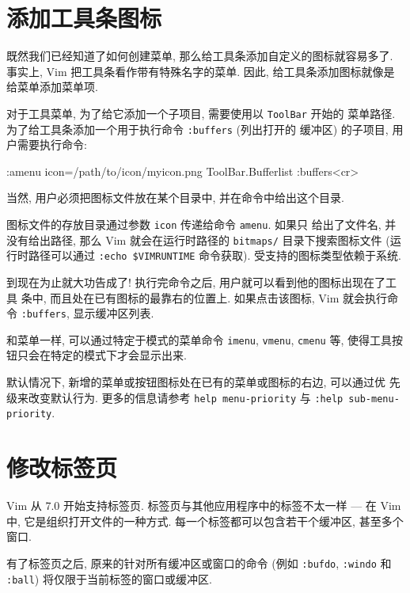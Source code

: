 \begin{warning}
\section{添加工具条图标}
\label{sec:adding_toolbar_icons}

既然我们已经知道了如何创建菜单, 那么给工具条添加自定义的图标就容易多了.
事实上, Vim 把工具条看作带有特殊名字的菜单. 因此, 给工具条添加图标就像是
给菜单添加菜单项.

对于工具菜单, 为了给它添加一个子项目, 需要使用以 \texttt{ToolBar} 开始的
菜单路径. 为了给工具条添加一个用于执行命令 \texttt{:buffers} (列出打开的
缓冲区) 的子项目, 用户需要执行命令:
\begin{vimcmd}
:amenu icon=/path/to/icon/myicon.png ToolBar.Bufferlist :buffers<cr>
\end{vimcmd}
当然, 用户必须把图标文件放在某个目录中, 并在命令中给出这个目录.

图标文件的存放目录通过参数 \texttt{icon} 传递给命令 \texttt{amenu}. 如果只
给出了文件名, 并没有给出路径, 那么 Vim 就会在运行时路径的 \texttt{bitmaps/}
目录下搜索图标文件 (运行时路径可以通过 \texttt{:echo \$VIMRUNTIME}
命令获取). 受支持的图标类型依赖于系统.

到现在为止就大功告成了! 执行完命令之后, 用户就可以看到他的图标出现在了工具
条中, 而且处在已有图标的最靠右的位置上. 如果点击该图标, Vim 就会执行命令
\texttt{:buffers}, 显示缓冲区列表.

和菜单一样, 可以通过特定于模式的菜单命令 \texttt{imenu}, \texttt{vmenu},
\texttt{cmenu} 等, 使得工具按钮只会在特定的模式下才会显示出来.

\begin{warning}
默认情况下, 新增的菜单或按钮图标处在已有的菜单或图标的右边, 可以通过优
先级来改变默认行为. 更多的信息请参考 \texttt{help menu-priority} 与 
\texttt{:help sub-menu-priority}.
\end{warning}

\section{修改标签页}
\label{sec:modifying_tabs}
Vim 从 7.0 开始支持标签页. 标签页与其他应用程序中的标签不太一样 --- 在
Vim 中, 它是组织打开文件的一种方式. 每一个标签都可以包含若干个缓冲区,
甚至多个窗口.

有了标签页之后, 原来的针对所有缓冲区或窗口的命令 (例如 \texttt{:bufdo},
\texttt{:windo} 和 \texttt{:ball}) 将仅限于当前标签的窗口或缓冲区.


\end{warning}
